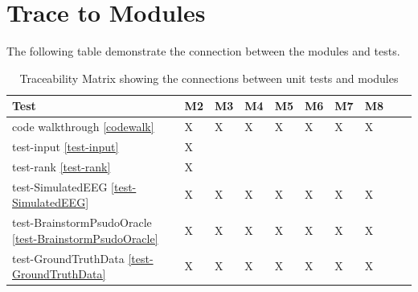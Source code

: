 \documentclass[12pt, titlepage]{article}
\begin{document}
\section{Trace to Modules}
The following table demonstrate the connection between the modules and tests.

\begin{table}[h]
    \begin{tabular}{|l|l|l|l|l|l|l|l|l|l|}
        \hline
         Test& M2 &M3 & M4 & M5 & M6 & M7 & M8 \\ \hline
       code walkthrough \ref{codewalk} & X &X  & X & X & X &X &X\\ \hline
       test-input \ref{test-input} & X &  &  &  &  & & \\ \hline
       test-rank \ref{test-rank} &  X & &  &  &  &  & \\ \hline
       test-SimulatedEEG  \ref{test-SimulatedEEG}  & X &X  & X & X & X &X &X \\\hline
       test-BrainstormPsudoOracle \ref{test-BrainstormPsudoOracle} & X &X  & X & X & X &X &X \\ \hline
       test-GroundTruthData \ref{test-GroundTruthData}  & X &X  & X & X & X &X &X \\ \hline
    \end{tabular}
\caption{Traceability Matrix showing the connections between unit tests and
    modules}
\label{Md_trace}
\end{table}		





\end{document}

